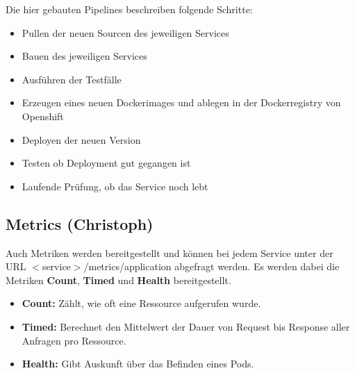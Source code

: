 \documentclass[11pt, a4paper, twoside]{article}   	%
\begin{document}
Die hier gebauten Pipelines beschreiben folgende Schritte:
\begin{itemize}
	\item  Pullen der neuen Sourcen des jeweiligen Services
	\item Bauen des jeweiligen Services
	\item Ausführen der Testfälle
	\item Erzeugen eines neuen Dockerimages und ablegen in der Dockerregistry von Openshift
	\item Deployen der neuen Version
	\item Testen ob Deployment gut gegangen ist
	\item Laufende Prüfung, ob das Service noch lebt
\end{itemize}


\subsection{Metrics (Christoph)}
Auch Metriken werden bereitgestellt und können bei jedem Service unter der URL $<$service$>$/metrics/application abgefragt werden.
Es werden dabei die Metriken \textbf{Count}, \textbf{Timed} und \textbf{Health} bereitgestellt.
\begin{itemize}
	\item \textbf{Count: }Zählt, wie oft eine Ressource aufgerufen wurde.
	\item \textbf{Timed: }Berechnet den Mittelwert der Dauer von Request bis Response aller Anfragen pro Ressource.
	\item \textbf{Health: }Gibt Auskunft über das Befinden eines Pods.
\end{itemize}
\end{document}
